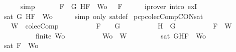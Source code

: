 \begin{isabellebody}
\ \ \ \ \isamarkupfalse%
\ simp\isanewline
\ \ \isamarkupfalse%
\ \isamarkupfalse%
\ {\isachardoublequoteopen}{\isasymexists}{\isasymA}{\isachardot}\ {\isasymforall}F\ {\isasymin}\ {\isacharparenleft}{\isacharbraceleft}G{\isacharcomma}\isactrlbold {\isasymnot}\ H{\isacharcomma}F{\isacharbraceright}\ {\isasymunion}\ Wo{\isacharparenright}{\isachardot}\ {\isasymA}\ {\isasymTurnstile}\ F{\isachardoublequoteclose}\isanewline
\ \ \ \ \isamarkupfalse%
\ {\isacharparenleft}iprover\ intro{\isacharcolon}\ exI{\isacharparenright}\isanewline
\ \ \isamarkupfalse%
\ {\isachardoublequoteopen}sat\ {\isacharparenleft}{\isacharbraceleft}G{\isacharcomma}\isactrlbold {\isasymnot}\ H{\isacharcomma}F{\isacharbraceright}\ {\isasymunion}\ Wo{\isacharparenright}{\isachardoublequoteclose}\isanewline
\ \ \ \ \isamarkupfalse%
\ {\isacharparenleft}simp\ only{\isacharcolon}\ sat{\isacharunderscore}def{\isacharparenright}\isanewline
{}\isamarkupfalse%
%
\endisatagproof
{\isafoldproof}%
%
\isadelimproof
\isanewline
%
\endisadelimproof
\isanewline
{}\isamarkupfalse%
\ pcp{\isacharunderscore}colecComp{\isacharunderscore}CON{\isacharunderscore}sat{}{\isacharcolon}\isanewline
\ \ \ {\isachardoublequoteopen}W\ {\isasymin}\ colecComp{\isachardoublequoteclose}\isanewline
\ \ \ \ \ \ \ \ \ \ {\isachardoublequoteopen}F\ {\isacharequal}\ \isactrlbold {\isasymnot}\ {\isacharparenleft}\isactrlbold {\isasymnot}\ G{\isacharparenright}{\isachardoublequoteclose}\isanewline
\ \ \ \ \ \ \ \ \ \ {\isachardoublequoteopen}H\ {\isacharequal}\ G{\isachardoublequoteclose}\isanewline
\ \ \ \ \ \ \ \ \ \ {\isachardoublequoteopen}F\ {\isasymin}\ W{\isachardoublequoteclose}\isanewline
\ \ \ \ \ \ \ \ \ \ {\isachardoublequoteopen}finite\ Wo{\isachardoublequoteclose}\isanewline
\ \ \ \ \ \ \ \ \ \ {\isachardoublequoteopen}Wo\ {\isasymsubseteq}\ W{\isachardoublequoteclose}\isanewline
\ \ \ \ \ \ \ \ \ {\isachardoublequoteopen}sat\ {\isacharparenleft}{\isacharbraceleft}G{\isacharcomma}H{\isacharcomma}F{\isacharbraceright}\ {\isasymunion}\ Wo{\isacharparenright}{\isachardoublequoteclose}\isanewline
%
\isadelimproof
%
\endisadelimproof
%
\isatagproof
{}\isamarkupfalse%
\ {\isacharminus}\isanewline
\ \ \isamarkupfalse%
\ {\isachardoublequoteopen}sat\ {\isacharparenleft}{\isacharbraceleft}F{\isacharbraceright}\ {\isasymunion}\ Wo{\isacharparenright}{\isachardoublequoteclose}\isanewline
\ \ \ \ \isamarkupfalse%

\end{isabellebody}
